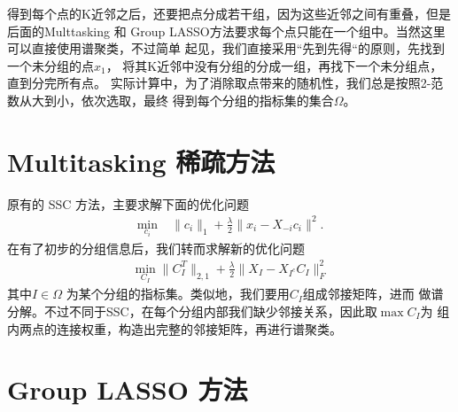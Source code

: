 \documentclass[main]{subfiles}
\begin{document}
得到每个点的K近邻之后，还要把点分成若干组，因为这些近邻之间有重叠，但是后面的Multtasking
和 Group LASSO方法要求每个点只能在一个组中。当然这里可以直接使用谱聚类，不过简单
起见，我们直接采用“先到先得“的原则，先找到一个未分组的点$x_1$，
将其K近邻中没有分组的分成一组，再找下一个未分组点，直到分完所有点。
实际计算中，为了消除取点带来的随机性，我们总是按照2-范数从大到小，依次选取，最终
得到每个分组的指标集的集合$\Omega$。

\section{Multitasking 稀疏方法}
原有的 SSC 方法，主要求解下面的优化问题
\begin{align}\label{eq:Lasso}
  \min_{c_i} \; &\|c_i\|_1+\frac{\lambda}{2}\|x_i-X_{-i}c_i\|^2.
\end{align}
在有了初步的分组信息后，我们转而求解新的优化问题
\begin{align} \label{eq:Multi}
  \min_{C_I} \|C_I^T\|_{2, 1} + \frac{\lambda}{2} \|X_I - X_{I^c}C_I\|_F^2
\end{align}
其中$I\in \Omega$ 为某个分组的指标集。类似地，我们要用$C_I$组成邻接矩阵，进而
做谱分解。不过不同于SSC，在每个分组内部我们缺少邻接关系，因此取$\max C_I$为
组内两点的连接权重，构造出完整的邻接矩阵，再进行谱聚类。

\section{Group LASSO 方法}
\end{document}
